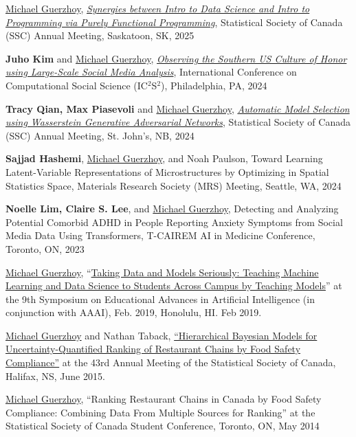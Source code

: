 \documentclass[letterpaper,11pt]{article}
\begin{document}
\begin{revnumerate}
    \item \underline{Michael Guerzhoy}, \href{https://ssc.ca/en/meeting/annual/presentation/synergies-between-intro-data-science-and-intro-programming-purely}{\textit{Synergies between Intro to Data Science and Intro to Programming via Purely Functional Programming}},   Statistical Society of Canada (SSC) Annual Meeting, Saskatoon, SK, 2025
	\item \textbf{Juho Kim} and \underline{Michael Guerzhoy}, \href{https://doi.org/10.31234/osf.io/2sy4n}{\textit{Observing the Southern US Culture of Honor using Large-Scale Social Media Analysis}}, International Conference on Computational Social Science (IC$^2$S$^2$), Philadelphia, PA, 2024
	\item \textbf{Tracy Qian, Max Piasevoli} and \underline{Michael Guerzhoy}, \href{https://ssc.ca/en/meeting/annual/presentation/automatic-model-selection-using-wasserstein-generative-adversarial}{\textit{Automatic Model Selection using Wasserstein Generative Adversarial Networks}}, Statistical Society of Canada (SSC) Annual Meeting, St. John's, NB,  2024
	\item \textbf{Sajjad Hashemi}, \underline{Michael Guerzhoy}, and Noah Paulson, Toward Learning Latent-Variable Representations of Microstructures by Optimizing in Spatial Statistics Space, Materials Research Society (MRS) Meeting, Seattle, WA, 2024
	\item \textbf{Noelle Lim, Claire S. Lee}, and \underline{Michael Guerzhoy},  Detecting and Analyzing Potential Comorbid ADHD in People Reporting Anxiety Symptoms from Social Media Data Using Transformers, T-CAIREM AI in Medicine Conference, Toronto, ON, 2023
	\item 
	\underline{Michael Guerzhoy}, ``\href{https://pages.mtu.edu/~lebrown/eaai/prior/eaai-19/index.html}{Taking Data and Models Seriously: Teaching Machine Learning and Data Science to Students Across Campus by Teaching Models}'' at the 9th Symposium on Educational Advances in Artificial Intelligence (in conjunction with AAAI), Feb. 2019, Honolulu, HI. Feb 2019.
	
	\item
\underline{Michael Guerzhoy} and Nathan Taback, \href{https://ssc.ca/sites/default/files/pdf/ssc15/c2-mg.pdf}{``Hierarchical Bayesian Models for Uncertainty-Quantified Ranking of Restaurant Chains by Food Safety Compliance''} at the 43rd Annual Meeting of the Statistical Society of Canada, Halifax, NS,  June 2015.

\item
\underline{Michael Guerzhoy}, ``Ranking Restaurant Chains in Canada by Food Safety Compliance: Combining Data From Multiple Sources for Ranking'' at the Statistical Society of Canada Student Conference, Toronto, ON, May 2014

\end{revnumerate}
\end{document}
